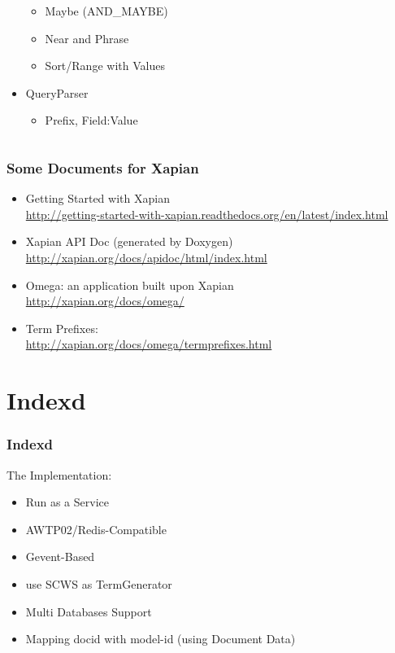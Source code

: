 \documentclass[unicode]{beamer}
\begin{document}
\begin{CJK}{UTF8}{gbsn}
\begin{frame}
\begin{columns}[t]
\begin{column}{0.4\textwidth}
\begin{itemize}
\begin{itemize}
          \item Maybe {\tiny (AND\_MAYBE)}
          \item Near and Phrase
          \item Sort/Range with Values
          \end{itemize}
        \item QueryParser \vfill
          \begin{itemize}
          \item Prefix, Field:Value
          \end{itemize}
        \end{itemize}
      \end{column}
      \end{columns}
  \end{frame}

  \begin{frame}
    \frametitle{Some Documents for Xapian}
    \begin{itemize}
    \item Getting Started with Xapian\\
      {\tiny \url{http://getting-started-with-xapian.readthedocs.org/en/latest/index.html}}
    \item Xapian API Doc (generated by Doxygen) \\
      {\tiny \url{http://xapian.org/docs/apidoc/html/index.html}}
    \item Omega: an application built upon Xapian \\
      {\tiny \url{http://xapian.org/docs/omega/}}
    \item Term Prefixes:\\
      {\tiny \url{http://xapian.org/docs/omega/termprefixes.html}}
    \end{itemize}
  \end{frame}

  \section{Indexd}
  \begin{frame}
    \frametitle{Indexd}
    The Implementation: \vfill
    \begin{itemize}
    \item Run as a Service \vfill
    \item AWTP02/Redis-Compatible \vfill
    \item Gevent-Based \vfill
    \item use SCWS as TermGenerator \vfill
    \item Multi Databases Support \vfill
    \item Mapping docid with model-id (using Document Data)
    \end{itemize}
  \end{frame}


\end{CJK}
\end{document}
